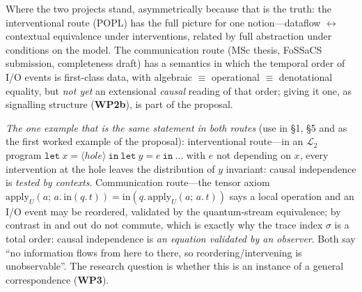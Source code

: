 \documentclass[11pt,a4paper]{article}
\newcommand{\WP}[1]{\textbf{WP#1}}
\begin{document}
Where the two projects stand, asymmetrically because that is the truth: the interventional route (POPL) has the full picture for one notion---dataflow $\leftrightarrow$ contextual equivalence under interventions, related by full abstraction under conditions on the model. The communication route (MSc thesis, FoSSaCS submission, completeness draft) has a semantics in which the temporal order of I/O events is first-class data, with algebraic $\equiv$ operational $\equiv$ denotational equality, but \emph{not yet} an extensional \emph{causal} reading of that order; giving it one, as signalling structure (\WP{2b}), is part of the proposal.

\emph{The one example that is the same statement in both routes} (use in \S1, \S5 and as the first worked example of the proposal): interventional route---in an $\mathcal{L}_2$ program $\mathtt{let}\ x = \langle\mathit{hole}\rangle\ \mathtt{in}\ \mathtt{let}\ y = e\ \mathtt{in}\ \dots$ with $e$ not depending on $x$, every intervention at the hole leaves the distribution of $y$ invariant: causal independence is \emph{tested by contexts}. Communication route---the tensor axiom $\mathrm{apply}_U(a;\,a.\,\mathrm{in}(q.\,t)) = \mathrm{in}(q.\,\mathrm{apply}_U(a;\,a.\,t))$ says a local operation and an I/O event may be reordered, validated by the quantum-stream equivalence; by contrast $\mathrm{in}$ and $\mathrm{out}$ do not commute, which is exactly why the trace index $\sigma$ is a total order: causal independence is \emph{an equation validated by an observer}. Both say ``no information flows from here to there, so reordering/intervening is unobservable''. The research question is whether this is an instance of a general correspondence (\WP{3}).
\end{document}
